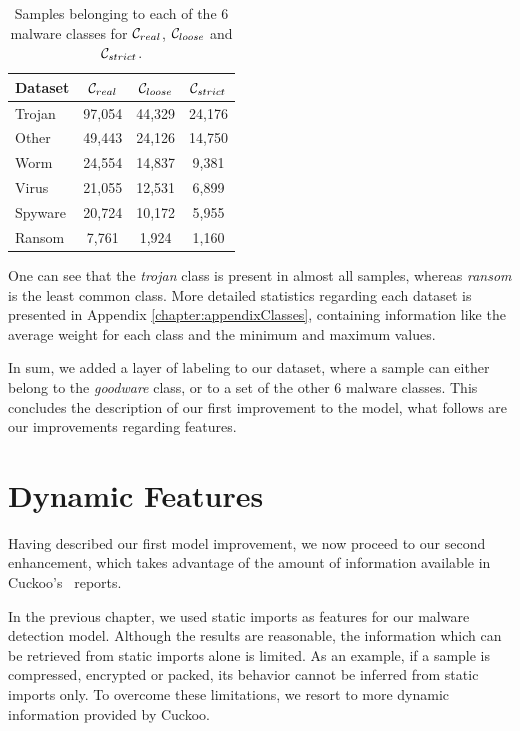 \begin{table}[!htb]
	\renewcommand{\arraystretch}{1.2} %
	\centering
	\begin{tabular}{lccc}
		\toprule
		Dataset			& $\mathcal{C}_{real}$ & $\mathcal{C}_{loose}$ & $\mathcal{C}_{strict}$	\\
		\midrule
		Trojan			& 97,054 & 44,329 & 24,176\\
		Other			& 49,443 & 24,126 & 14,750\\
		Worm			& 24,554 & 14,837 & 9,381\\
		Virus			& 21,055 & 12,531 & 6,899\\
		Spyware			& 20,724 & 10,172 & 5,955\\
		Ransom			& 7,761 & 1,924 & 1,160\\
		\bottomrule
	\end{tabular}
	\caption{Samples belonging to each of the 6 malware classes for $\mathcal{C}_{real}$, $\mathcal{C}_{loose}$ and $\mathcal{C}_{strict}$.}
	\label{tab:dataset_sizes_new}
\end{table}

One can see that the \textit{trojan} class is present in almost all samples, whereas \textit{ransom} is the least common class.
More detailed statistics regarding each dataset is presented in Appendix \ref{chapter:appendixClasses}, containing information like the average weight for each class and the minimum and maximum values.

\medskip

In sum, we added a layer of labeling to our dataset, where a sample can either belong to the \textit{goodware} class, or to a set of the other 6 malware classes.
This concludes the description of our first improvement to the model, what follows are our improvements regarding features.

\section{Dynamic Features}
\label{section:improvements_dynamic_features}

Having described our first model improvement, we now proceed to our second enhancement, which takes advantage of the amount of information available in Cuckoo's~\cite{tool:cuckoo} reports.

In the previous chapter, we used static imports as features for our malware detection model.
Although the results are reasonable, the information which can be retrieved from static imports alone is limited.
As an example, if a sample is compressed, encrypted or packed, its behavior cannot be inferred from static imports only.
To overcome these limitations, we resort to more dynamic information provided by Cuckoo.

